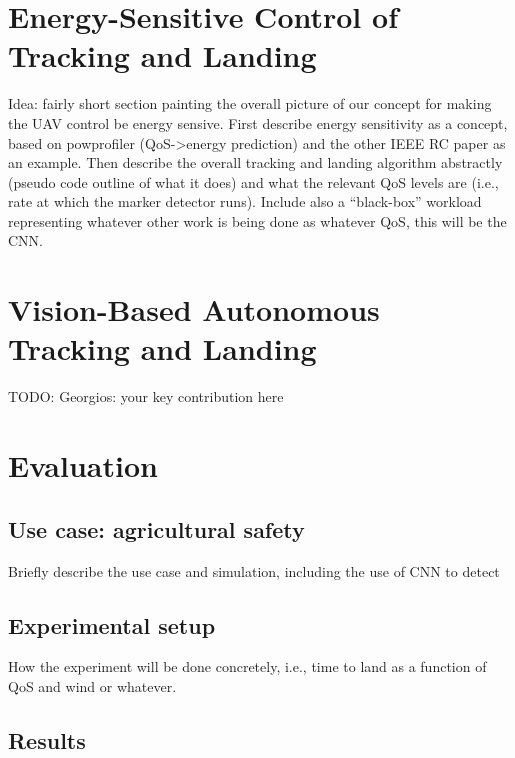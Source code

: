 \documentclass[conference]{IEEEtran}
\begin{document}

\section{Energy-Sensitive Control of Tracking and Landing}
\label{sec:approach}

Idea: fairly short section painting the overall picture of our concept
for making the UAV control be energy sensive. First describe energy
sensitivity as a concept, based on powprofiler (QoS->energy
prediction) and the other IEEE RC paper as an example. Then describe
the overall tracking and landing algorithm abstractly (pseudo code
outline of what it does) and what the relevant QoS levels are (i.e.,
rate at which the marker detector runs). Include also a ``black-box''
workload representing whatever other work is being done as whatever
QoS, this will be the CNN.

\section{Vision-Based Autonomous Tracking and Landing}
\label{sec:landing}

TODO: Georgios: your key contribution here

\section{Evaluation}
\label{sec:experimental}

\subsection{Use case: agricultural safety}

Briefly describe the use case and simulation, including the use of CNN
to detect

\subsection{Experimental setup}

How the experiment will be done concretely, i.e., time to land as a
function of QoS and wind or whatever.

\subsection{Results}
\end{document}
